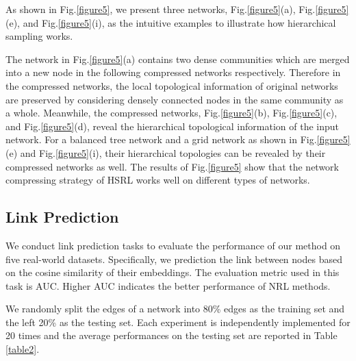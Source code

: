 \documentclass[conference]{IEEEtran}
\begin{document}
As shown in Fig.\ref{figure5}, we present three networks, Fig.\ref{figure5}(a), Fig.\ref{figure5}(e), and Fig.\ref{figure5}(i), as the intuitive examples to illustrate how hierarchical sampling works. 

The network in Fig.\ref{figure5}(a) contains two dense communities which are merged into a new node in the following compressed networks respectively. Therefore in the compressed networks, the local topological information of original networks are preserved by considering densely connected nodes in the same community as a whole. Meanwhile, the compressed networks, Fig.\ref{figure5}(b), Fig.\ref{figure5}(c), and Fig.\ref{figure5}(d), reveal the hierarchical topological information of the input network. For a balanced tree network and a grid network as shown in Fig.\ref{figure5}(e) and Fig.\ref{figure5}(i), their hierarchical topologies can be revealed by their compressed networks as well. The results of Fig.\ref{figure5} show that the network compressing strategy of HSRL works well on different types of networks.

\subsection{Link Prediction}
We conduct link prediction tasks to evaluate the performance of our method on five real-world datasets. Specifically, we prediction the link between nodes based on the cosine similarity of their embeddings. The evaluation metric used in this task is AUC. Higher AUC indicates the better performance of NRL methods.

We randomly split the edges of a network into 80\% edges as the training set and the left 20\% as the testing set. Each experiment is independently implemented for 20 times and the average performances on the testing set are reported in Table \ref{table2}.
\end{document}
